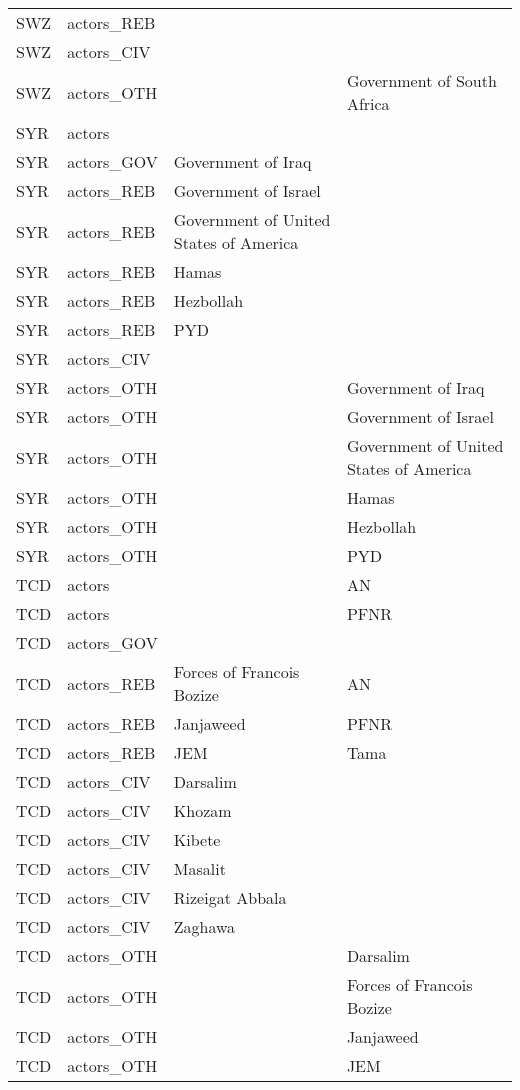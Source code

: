 \begin{table}[ht]
\begin{tabular}{llll}
  SWZ & actors\_REB &  &  \\ 
  SWZ & actors\_CIV &  &  \\ 
  SWZ & actors\_OTH &  & Government of South Africa \\ 
  SYR & actors &  &  \\ 
  SYR & actors\_GOV & Government of Iraq &  \\ 
  SYR & actors\_REB & Government of Israel &  \\ 
  SYR & actors\_REB & Government of United States of America &  \\ 
  SYR & actors\_REB & Hamas &  \\ 
  SYR & actors\_REB & Hezbollah &  \\ 
  SYR & actors\_REB & PYD &  \\ 
  SYR & actors\_CIV &  &  \\ 
  SYR & actors\_OTH &  & Government of Iraq \\ 
  SYR & actors\_OTH &  & Government of Israel \\ 
  SYR & actors\_OTH &  & Government of United States of America \\ 
  SYR & actors\_OTH &  & Hamas \\ 
  SYR & actors\_OTH &  & Hezbollah \\ 
  SYR & actors\_OTH &  & PYD \\ 
  TCD & actors &  & AN \\ 
  TCD & actors &  & PFNR \\ 
  TCD & actors\_GOV &  &  \\ 
  TCD & actors\_REB & Forces of Francois Bozize & AN \\ 
  TCD & actors\_REB & Janjaweed & PFNR \\ 
  TCD & actors\_REB & JEM & Tama \\ 
  TCD & actors\_CIV & Darsalim &  \\ 
  TCD & actors\_CIV & Khozam &  \\ 
  TCD & actors\_CIV & Kibete &  \\ 
  TCD & actors\_CIV & Masalit &  \\ 
  TCD & actors\_CIV & Rizeigat Abbala &  \\ 
  TCD & actors\_CIV & Zaghawa &  \\ 
  TCD & actors\_OTH &  & Darsalim \\ 
  TCD & actors\_OTH &  & Forces of Francois Bozize \\ 
  TCD & actors\_OTH &  & Janjaweed \\ 
  TCD & actors\_OTH &  & JEM \\ 

\end{tabular}
\end{table}
